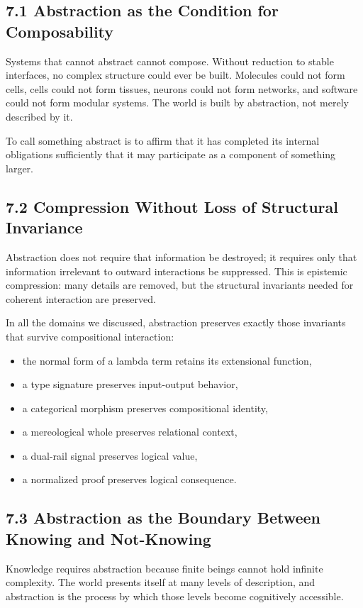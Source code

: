 \documentclass[12pt,letterpaper]{article}
\begin{document}
\subsection{7.1 Abstraction as the Condition for Composability}

Systems that cannot abstract cannot compose. Without reduction to stable interfaces, no complex structure could ever be built. Molecules could not form cells, cells could not form tissues, neurons could not form networks, and software could not form modular systems. The world is built by abstraction, not merely described by it.

To call something abstract is to affirm that it has completed its internal obligations sufficiently that it may participate as a component of something larger.

\subsection{7.2 Compression Without Loss of Structural Invariance}

Abstraction does not require that information be destroyed; it requires only that information irrelevant to outward interactions be suppressed. This is epistemic compression: many details are removed, but the structural invariants needed for coherent interaction are preserved.

In all the domains we discussed, abstraction preserves exactly those invariants that survive compositional interaction:
\begin{itemize}
    \item the normal form of a lambda term retains its extensional function,
    \item a type signature preserves input-output behavior,
    \item a categorical morphism preserves compositional identity,
    \item a mereological whole preserves relational context,
    \item a dual-rail signal preserves logical value,
    \item a normalized proof preserves logical consequence.
\end{itemize}

\subsection{7.3 Abstraction as the Boundary Between Knowing and Not-Knowing}

Knowledge requires abstraction because finite beings cannot hold infinite complexity. The world presents itself at many levels of description, and abstraction is the process by which those levels become cognitively accessible.
\end{document}
